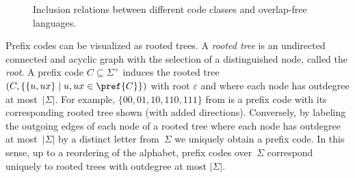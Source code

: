 \begin{figure}[ht]
	\centering
	\caption[Relations between different code classes and overlap-free languages]{Inclusion relations between different code classes and overlap-free languages.}
	\label{fig:code-hasse}
\end{figure}

 
\begin{remark} \label{syncmax:rem:root-tree-prefix-code}
	Prefix codes can be visualized as rooted trees.
	A \emph{rooted tree} is an undirected connected and acyclic graph
	with the selection of a distinguished node, called the \emph{root}.
	A prefix code $C \subseteq \Sigma^+$
	induces the rooted tree $(C,  \{ \{ u, ux \} \mid u,ux \in \pref{C} \})$ with root $\varepsilon$ and 
	where each node has outdegree at most~$|\Sigma|$.
	For example, $\{00,01,10,110,111\}$ from 
	is a prefix code with its corresponding
	rooted tree shown (with added directions).
	Conversely, by labeling the outgoing edges 
	of each node of a rooted tree where each node has outdegree at most~$|\Sigma|$
	by a distinct letter from~$\Sigma$
	we uniquely obtain a prefix code.
	In this sense, up to a reordering of the alphabet,
	prefix codes over~$\Sigma$
	correspond uniquely to rooted trees with outdegree at most $|\Sigma|$.
\end{remark}

